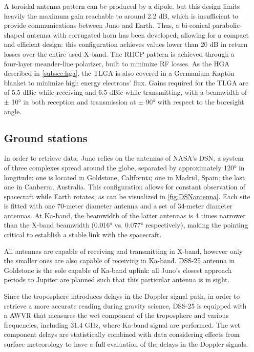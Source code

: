 A toroidal antenna pattern can be produced by a dipole, but this design limits heavily the maximum gain reachable to around 2.2 dB, which is insufficient to provide communications between Juno and Earth.
Thus, a bi-conical parabolic-shaped antenna with corrugated horn has been developed, allowing for a compact and efficient design: this configuration achieves values lower than 20 dB in return losses over the entire used X-band\cite{telecommunication_antennas}. 
The RHCP pattern is achieved through a four-layer meander-line polarizer, built to minimize RF losses.  As the HGA described in \autoref{subsec:hga}, the TLGA is also covered in a Germanium-Kapton blanket to minimize high energy electrons' flux.
Gains required for the TLGA are of 5.5 dBic while receiving and 6.5 dBic while transmitting, with a beamwidth of $\pm$ 10° in both reception and transmission at $\pm$ 90° with respect to the boresight angle\cite{juno_telecommunication}. 

\subsection{Ground stations}
\label{subsec:gs}

In order to retrieve data, Juno relies on the antennas of NASA's DSN, a system of three complexes spread around the globe, separated by approximately 120° in longitude: one is located in Goldstone, California; one in Madrid, Spain; the last one in Canberra, Australia. This configuration allows for constant observation of spacecraft while Earth rotates, as can be visualized in \autoref{fig:DSNantenna}.
Each site is fitted with one 70-meter diameter antenna and a set of 34-meter diameter antennas. At Ka-band, the beamwidth of the latter antennas is 4 times narrower than the X-band beamwidth (0.016° vs. 0.077° respectively), making the pointing critical to establish a stable link with the spacecraft.

All antennas are capable of receiving and transmitting in X-band, however only the smaller ones are also capable of receiving in Ka-band. DSS-25 antenna in Goldstone is the sole capable of Ka-band uplink: all Juno's closest approach periods to Jupiter are planned such that this particular antenna is in sight.

Since the troposphere introduces delays in the Doppler signal path, in order to retrieve a more accurate reading during gravity science, DSS-25 is equipped with a AWVR that measures the wet component of the troposphere and various frequencies, including 31.4 GHz, where Ka-band signal are performed. The wet component delays are statistically combined with data considering effects from surface meteorology to have a full evaluation of the delays in the Doppler signals\cite{calibration_performance}.

